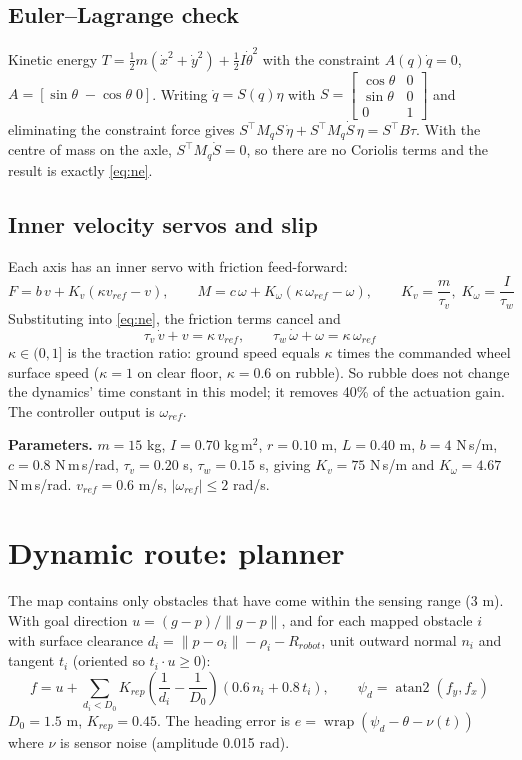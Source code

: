 \documentclass[11pt,a4paper]{article}
\newcommand{\dd}[1]{\dot{#1}}
\begin{document}
\subsection{Euler--Lagrange check}
Kinetic energy $T=\tfrac12 m(\dd x^2+\dd y^2)+\tfrac12 I\dd\theta^2$ with the constraint $A(q)\dd q=0$, $A=[\sin\theta\;-\!\cos\theta\;0]$. Writing $\dd q=S(q)\eta$ with $S=\begin{bmatrix}\cos\theta&0\\ \sin\theta&0\\ 0&1\end{bmatrix}$ and eliminating the constraint force gives $S^\top M_q S\,\dd\eta+S^\top M_q\dd S\,\eta=S^\top B\tau$. With the centre of mass on the axle, $S^\top M_q\dd S=0$, so there are no Coriolis terms and the result is exactly \eqref{eq:ne}.

\subsection{Inner velocity servos and slip}
Each axis has an inner servo with friction feed-forward:
\begin{equation}
F=b\,v+K_v(\kappa v_{ref}-v),\qquad M=c\,\omega+K_\omega(\kappa\,\omega_{ref}-\omega),\qquad K_v=\frac{m}{\tau_v},\;K_\omega=\frac{I}{\tau_w}
\end{equation}
Substituting into \eqref{eq:ne}, the friction terms cancel and
\begin{equation}
\tau_v\,\dd v+v=\kappa\,v_{ref},\qquad \tau_w\,\dd\omega+\omega=\kappa\,\omega_{ref}
\label{eq:lag}
\end{equation}
$\kappa\in(0,1]$ is the traction ratio: ground speed equals $\kappa$ times the commanded wheel surface speed ($\kappa=1$ on clear floor, $\kappa=0.6$ on rubble). So rubble does not change the dynamics' time constant in this model; it removes 40\% of the actuation gain. The controller output is $\omega_{ref}$.

\textbf{Parameters.} $m=15$ kg, $I=0.70$ kg\,m$^2$, $r=0.10$ m, $L=0.40$ m, $b=4$ N\,s/m, $c=0.8$ N\,m\,s/rad, $\tau_v=0.20$ s, $\tau_w=0.15$ s, giving $K_v=75$ N\,s/m and $K_\omega=4.67$ N\,m\,s/rad. $v_{ref}=0.6$ m/s, $|\omega_{ref}|\le2$ rad/s.

\section{Dynamic route: planner}
The map contains only obstacles that have come within the sensing range (3 m). With goal direction $u=(g-p)/\|g-p\|$, and for each mapped obstacle $i$ with surface clearance $d_i=\|p-o_i\|-\rho_i-R_{robot}$, unit outward normal $n_i$ and tangent $t_i$ (oriented so $t_i\!\cdot u\ge0$):
\begin{equation}
f=u+\sum_{d_i<D_0}K_{rep}\left(\frac1{d_i}-\frac1{D_0}\right)(0.6\,n_i+0.8\,t_i),\qquad \psi_d=\operatorname{atan2}(f_y,f_x)
\end{equation}
$D_0=1.5$ m, $K_{rep}=0.45$. The heading error is $e=\operatorname{wrap}(\psi_d-\theta-\nu(t))$ where $\nu$ is sensor noise (amplitude 0.015 rad).
\end{document}
